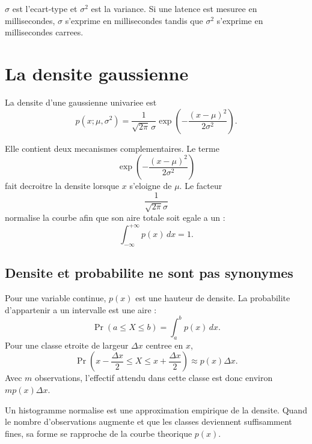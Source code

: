 \begin{attentionbox}
$\sigma$ est l'ecart-type et $\sigma^2$ est la variance. Si une latence est
mesuree en millisecondes, $\sigma$ s'exprime en millisecondes tandis que
$\sigma^2$ s'exprime en millisecondes carrees.
\end{attentionbox}

\section{La densite gaussienne}

La densite d'une gaussienne univariee est
\begin{equation}
p(x;\mu,\sigma^2)=
\frac{1}{\sqrt{2\pi}\,\sigma}
\exp\left(-\frac{(x-\mu)^2}{2\sigma^2}\right).
\label{eq:gaussian}
\end{equation}

Elle contient deux mecanismes complementaires. Le terme
\begin{equation}
\exp\left(-\frac{(x-\mu)^2}{2\sigma^2}\right)
\end{equation}
fait decroitre la densite lorsque $x$ s'eloigne de $\mu$. Le facteur
\begin{equation}
\frac{1}{\sqrt{2\pi}\sigma}
\end{equation}
normalise la courbe afin que son aire totale soit egale a un :
\begin{equation}
\int_{-\infty}^{+\infty}p(x)\,dx=1.
\end{equation}

\subsection{Densite et probabilite ne sont pas synonymes}

Pour une variable continue, $p(x)$ est une hauteur de densite. La probabilite
d'appartenir a un intervalle est une aire :
\begin{equation}
\Pr(a\le X\le b)=\int_a^b p(x)\,dx.
\end{equation}
Pour une classe etroite de largeur $\Delta x$ centree en $x$,
\begin{equation}
\Pr\left(x-\frac{\Delta x}{2}\le X\le x+\frac{\Delta x}{2}\right)
\approx p(x)\Delta x.
\end{equation}
Avec $m$ observations, l'effectif attendu dans cette classe est donc environ
$m p(x)\Delta x$.

\begin{intuitionbox}
Un histogramme normalise est une approximation empirique de la densite. Quand
le nombre d'observations augmente et que les classes deviennent suffisamment
fines, sa forme se rapproche de la courbe theorique $p(x)$.
\end{intuitionbox}

